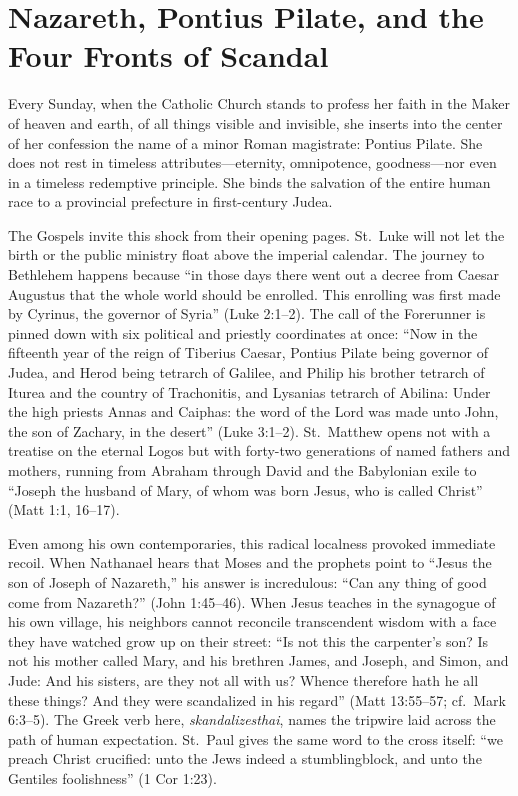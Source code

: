 \section{Nazareth, Pontius Pilate, and the Four Fronts of Scandal}

Every Sunday, when the Catholic Church stands to profess her faith in the Maker of heaven and earth, of all things visible and invisible, she inserts into the center of her confession the name of a minor Roman magistrate: Pontius Pilate. She does not rest in timeless attributes---eternity, omnipotence, goodness---nor even in a timeless redemptive principle. She binds the salvation of the entire human race to a provincial prefecture in first-century Judea.

The Gospels invite this shock from their opening pages. St.\ Luke will not let the birth or the public ministry float above the imperial calendar. The journey to Bethlehem happens because ``in those days there went out a decree from Caesar Augustus that the whole world should be enrolled. This enrolling was first made by Cyrinus, the governor of Syria'' (Luke 2:1--2). The call of the Forerunner is pinned down with six political and priestly coordinates at once: ``Now in the fifteenth year of the reign of Tiberius Caesar, Pontius Pilate being governor of Judea, and Herod being tetrarch of Galilee, and Philip his brother tetrarch of Iturea and the country of Trachonitis, and Lysanias tetrarch of Abilina: Under the high priests Annas and Caiphas: the word of the Lord was made unto John, the son of Zachary, in the desert'' (Luke 3:1--2). St.\ Matthew opens not with a treatise on the eternal Logos but with forty-two generations of named fathers and mothers, running from Abraham through David and the Babylonian exile to ``Joseph the husband of Mary, of whom was born Jesus, who is called Christ'' (Matt 1:1, 16--17).

Even among his own contemporaries, this radical localness provoked immediate recoil. When Nathanael hears that Moses and the prophets point to ``Jesus the son of Joseph of Nazareth,'' his answer is incredulous: ``Can any thing of good come from Nazareth?'' (John 1:45--46). When Jesus teaches in the synagogue of his own village, his neighbors cannot reconcile transcendent wisdom with a face they have watched grow up on their street: ``Is not this the carpenter's son? Is not his mother called Mary, and his brethren James, and Joseph, and Simon, and Jude: And his sisters, are they not all with us? Whence therefore hath he all these things? And they were scandalized in his regard'' (Matt 13:55--57; cf.\ Mark 6:3--5). The Greek verb here, \textit{skandalizesthai}, names the tripwire laid across the path of human expectation. St.\ Paul gives the same word to the cross itself: ``we preach Christ crucified: unto the Jews indeed a stumblingblock, and unto the Gentiles foolishness'' (1 Cor 1:23).

